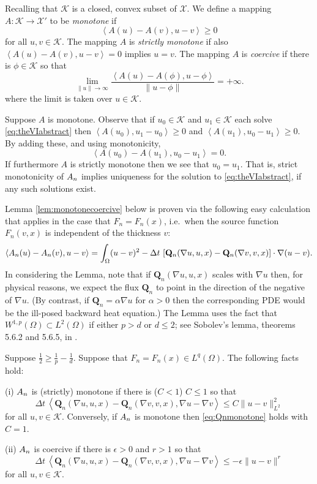 \documentclass[final,leqno,onefignum,onetabnum]{siamltex1213bueler}
\newcommand\bQ{\mathbf{Q}}
\newcommand\eps{\epsilon}
\renewcommand{\grad}{\nabla}
\newcommand{\ip}[2]{\ensuremath{\left<#1,#2\right>}}
\begin{document}
Recalling that $\mathcal{K}$ is a closed, convex subset of $\mathcal{X}$.  We define a mapping $A : \mathcal{K} \to \mathcal{X}'$ to be \emph{monotone} if
    $$\ip{A(u) - A(v)}{u-v} \ge 0$$
for all $u,v\in\mathcal{K}$.  The mapping $A$ is \emph{strictly monotone} if also $\ip{A(u) - A(v)}{u-v} = 0$ implies $u=v$.  The mapping $A$ is \emph{coercive} if there is $\phi\in \mathcal{K}$ so that
    $$\lim_{\|u\|\to\infty} \frac{\ip{A(u) - A(\phi)}{u-\phi}}{\|u-\phi\|} = +\infty.$$
where the limit is taken over $u\in\mathcal{K}$.

Suppose $A$ is monotone.  Observe that if $u_0 \in \mathcal{K}$ and $u_1 \in \mathcal{K}$ each solve \eqref{eq:theVIabstract} then $\ip{A(u_0)}{u_1-u_0} \ge 0$ and $\ip{A(u_1)}{u_0-u_1} \ge 0$.  By adding these, and using monotonicity,
    $$\ip{A(u_0) - A(u_1)}{u_0 - u_1} = 0.$$
If furthermore $A$ is strictly monotone then we see that $u_0=u_1$.  That is, strict monotonicity of $A_{n}$ implies uniqueness for the solution to \eqref{eq:theVIabstract}, if any such solutions exist.

Lemma \ref{lem:monotonecoercive} below is proven via the following easy calculation that applies in the case that $F_n=F_n(x)$, i.e.~when the source function $F_n(v,x)$ is independent of the thickness $v$:
   $$\ip{\An(u) - \An(v)}{u-v} = \int_\Omega (u-v)^2 - \Delta t\, \left[\bQ_n(\grad u,u,x) - \bQ_n(\grad v,v,x)\right] \cdot \grad(u-v).$$
In considering the Lemma, note that if $\bQ_n(\grad u,u,x)$ scales with $\grad u$ then, for physical reasons, we expect the flux $\bQ_n$ to point in the direction of the negative of $\grad u$.  (By contrast, if $\bQ_n = \alpha \grad u$ for $\alpha>0$ then the corresponding PDE would be the ill-posed backward heat equation.)  The Lemma uses the fact that $W^{1,p}(\Omega) \subset L^2(\Omega)$ if either $p>d$ or $d\le 2$; see Sobolev's lemma, theorems 5.6.2 and 5.6.5, in \cite{Evans}.

\begin{lemma}  \label{lem:monotonecoercive}  Suppose $\frac{1}{2} \ge \frac{1}{p} - \frac{1}{d}$.  Suppose that $F_n=F_n(x)\in L^q(\Omega)$.  The following facts hold:

(i)  $A_{n}$ is (strictly) monotone if there is ($C<1$) $C\le 1$ so that
\begin{equation}
\Delta t\,\ip{\bQ_n(\grad u,u,x) - \bQ_n(\grad v,v,x)}{\grad u - \grad v} \le C \|u-v\|_{L^2}^2 \label{eq:Qnmonotone}
\end{equation}
for all $u,v \in \mathcal{K}$.  Conversely, if $A_{n}$ is monotone then \eqref{eq:Qnmonotone} holds with $C=1$.

(ii)  $A_{n}$ is coercive if there is $\eps>0$ and $r>1$ so that
\begin{equation}
\Delta t\,\ip{\bQ_n(\grad u,u,x) - \bQ_n(\grad v,v,x)}{\grad u - \grad v} \le -\eps \|u-v\|^r \label{eq:Qncoercive}
\end{equation}
for all $u,v \in \mathcal{K}$.
\end{lemma}
\end{document}
